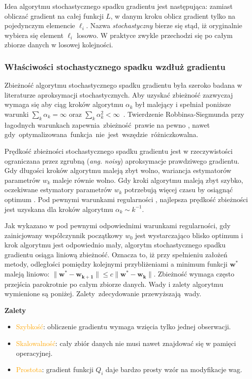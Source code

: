 Idea algorytmu stochastycznego spadku gradientu jest następująca: zamiast obliczać gradient na całej funkcji $L$, w danym kroku oblicz
gradient tylko na pojedynczym elemencie $\ell_{i}$. Nazwa \textit{stochastyczny} bierze się stąd, iż oryginalnie wybiera
się element $\ell_{i}$ losowo. W praktyce zwykle przechodzi się po całym zbiorze danych w losowej kolejności.

\subsubsection{Właściwości stochastycznego spadku wzdłuż gradientu}

Zbieżność algorytmu stochastycznego spadku gradientu była szeroko badana w literaturze aproksymacji stochastycznych. Aby uzyskać zbieżność zazwyczaj wymaga się aby ciąg kroków algorytmu $\alpha_k$ był malejący i spełniał poniższe warunki $\sum\nolimits_k \alpha_k = \infty$ oraz $\sum\nolimits_k \alpha_k^2 < \infty$~\cite{bott1}.
Twierdzenie Robbinsa-Siegmunda \cite{robbins} przy łagodnych warunkach zapewnia~zbieżność~prawie na pewno \cite{bottDOD}, nawet  gdy~optymalizowana~funkcja~nie~jest~wszędzie~różniczkowalna.

Prędkość zbieżności stochastycznego spadku gradientu jest w rzeczywistości ograniczana przez zgrubną (\textit{ang. noisy}) aproksymacje prawdziwego gradientu. Gdy długości kroków algorytmu
maleją zbyt wolno, wariancja estymatorów parametrów $w_k$ maleje równie wolno. Gdy kroki algorytmu maleją
zbyt szybko, oczekiwane estymatory parametrów $w_k$ potrzebują więcej czasu by osiągnąć optimum \cite{bott1}. Pod pewnymi warunkami regularności \cite{murata}, najlepsza prędkość zbieżności jest uzyskana dla kroków algorytmu $\alpha_k\sim k^{-1}$.

Jak wykazano w \cite{dennis} pod pewnymi odpowiednimi warunkami regularności, gdy zainicjowany współczynnik początkowy $w_0$ jest wystarczająco blisko optimum i krok algorytmu jest odpowiednio mały, algorytm stochastycznego spadku gradientu osiąga liniową zbieżność. Oznacza to, iż przy spełnieniu założeń metody, odległości pomiędzy kolejnymi przybliżeniami a minimum funkcji $\mathbf{w^{\ast}}$ maleją liniowo: $\parallel \mathbf{w^{\ast}} - \mathbf{w_{k+1}} \parallel \leqslant c \parallel \mathbf{w^{\ast}} - \mathbf{w_k} \parallel$. Zbieżność wymaga często przejścia parokrotnie po całym
zbiorze danych. Wady i zalety algorytmu wymienione są poniżej. Zalety~zdecydowanie przewyższają~wady.

\textbf{Zalety} \vspace{-5pt}
\begin{itemize}
\item \textcolor{orange}{Szybkość}: obliczenie gradientu wymaga wzięcia tylko jednej
obserwacji.
\item \textcolor{orange}{Skalowalność}: cały zbiór danych nie musi nawet znajdować się
w pamięci operacyjnej.
\item \textcolor{orange}{Prostota}: gradient funkcji  $Q_{i}$ daje bardzo prosty wzór na
modyfikacje wag.
\end{itemize}

